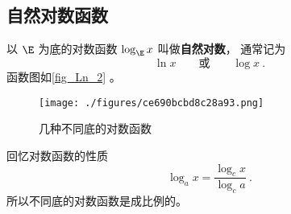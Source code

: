 
\begin{issues}
\issueDraft
\end{issues}

\subsection{自然对数函数}
以 $\E$ 为底的对数函数 $\log_{\E} x$ 叫做\textbf{自然对数}， 通常记为
\begin{equation}
\ln x \qquad \text{或} \qquad \log x~.
\end{equation}
函数图如\autoref{fig_Ln_2} 。
\begin{figure}[ht]
\centering
\texttt{[image: ./figures/ce690bcbd8c28a93.png]}
\caption{几种不同底的对数函数} \label{fig_Ln_2}
\end{figure}
回忆对数函数的性质
\begin{equation}
\log_a x = \frac{\log_c x}{\log_c a}~.
\end{equation}
所以不同底的对数函数是成比例的。

